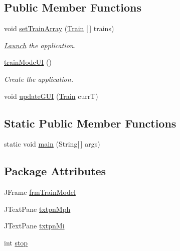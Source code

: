 \subsection*{Public Member Functions}
\begin{DoxyCompactItemize}
\item 
void \hyperlink{classtrainModel_1_1trainModeUI_a1d48455d0f924646325ee06eb4dd576d}{set\+Train\+Array} (\hyperlink{classtrainModel_1_1Train}{Train} \mbox{[}$\,$\mbox{]} trains)
\begin{DoxyCompactList}\small\item\em \hyperlink{classtrainModel_1_1Launch}{Launch} the application. \end{DoxyCompactList}\item 
\hyperlink{classtrainModel_1_1trainModeUI_adcb73bee7b6c10d7fce3a924b2fe092a}{train\+Mode\+UI} ()
\begin{DoxyCompactList}\small\item\em Create the application. \end{DoxyCompactList}\item 
void \hyperlink{classtrainModel_1_1trainModeUI_a1bb320064d891a9e4dfb26497f4c9d02}{update\+G\+UI} (\hyperlink{classtrainModel_1_1Train}{Train} currT)
\end{DoxyCompactItemize}
\subsection*{Static Public Member Functions}
\begin{DoxyCompactItemize}
\item 
static void \hyperlink{classtrainModel_1_1trainModeUI_a450d0a951e51bfe7f706c34275ba3e68}{main} (String\mbox{[}$\,$\mbox{]} args)
\end{DoxyCompactItemize}
\subsection*{Package Attributes}
\begin{DoxyCompactItemize}
\item 
J\+Frame \hyperlink{classtrainModel_1_1trainModeUI_ae35615a7c4b9acce2608935634929701}{frm\+Train\+Model}
\item 
J\+Text\+Pane \hyperlink{classtrainModel_1_1trainModeUI_ae4b47a5e7b1acac1da766e69c8bda376}{txtpn\+Mph}
\item 
J\+Text\+Pane \hyperlink{classtrainModel_1_1trainModeUI_ac47691c686814bf3314aca4a1519bedf}{txtpn\+Mi}
\item 
int \hyperlink{classtrainModel_1_1trainModeUI_a5d30f5361e1ed5891950e6d7690d4a58}{stop}
\end{DoxyCompactItemize}
